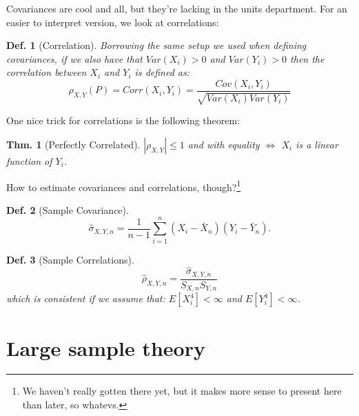 \documentclass{tufte-book}
\theoremstyle{mytheoremstyle}
\newtheorem*{thm}{Thm.}
\theoremstyle{mylemstyle}
\theoremstyle{mydefstyle}
\newtheorem*{mydef}{Def.}
\begin{document}
Covariances are cool and all, but they're lacking in the units department. For an easier to interpret version, we look at correlations:
\begin{mydef}[Correlation] Borrowing the same setup we used when defining covariances, if we also have that \(Var(X_i) > 0\) and \(Var(Y_i) > 0\) then the correlation between \(X_i\) and \(Y_i\) is defined as:
	\[\rho_{X, Y}(P) = Corr(X_i, Y_i) = \frac{Cov(X_i, Y_i)}{\sqrt{Var(X_i)Var(Y_i)}} \]
\end{mydef}
One nice trick for correlations is the following theorem:
\begin{thm}[Perfectly Correlated] \(|\rho_{X, Y}| \le 1\) and with equality \(\iff\) \(X_i\) is a linear function of \(Y_i\).
\end{thm}

How to estimate covariances and correlations, though?\footnote{We haven't really gotten there yet, but it makes more sense to present here than later, so whatevs.}
\begin{mydef}[Sample Covariance]
	\[\hat{\sigma}_{X, Y, n} = \frac{1}{n-1} \sum_{i = 1}^n (X_i - \bar{X}_n)(Y_i - \bar{Y}_n) \text{.}\]
\end{mydef}
\begin{mydef}[Sample Correlations]
	\[\hat{\rho}_{X, Y, n} = \frac{\hat{\sigma}_{X, Y, n}}{S_{X, n} S_{Y, n}} \]
which is consistent if we assume that: \(E[X_i^4] < \infty\) and \(E[Y_i^4] < \infty\). 
\end{mydef}

\chapter{Large sample theory}
\end{document}
